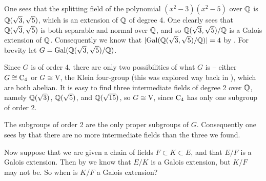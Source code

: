 \begin{example}
    One sees that the splitting field of the polynomial $(x^2 - 3)(x^2 - 5)$ over $\mathbb{Q}$ is $\mathbb{Q}(\sqrt3,\sqrt5)$, which is an extension of $\mathbb{Q}$ of degree 4. One clearly sees that $\mathbb{Q}(\sqrt3,\sqrt5)$ is both separable and normal over $\mathbb{Q}$, and so $\mathbb{Q}(\sqrt3,\sqrt5)/\mathbb{Q}$ is a Galois extension of $\mathbb{Q}$. Consequently we know that $|\mathrm{Gal}(\mathbb{Q}(\sqrt3,\sqrt5)/\mathbb{Q})| = 4$ by . For brevity let $G = \mathrm{Gal}(\mathbb{Q}(\sqrt3,\sqrt5)/\mathbb{Q})$.

    Since $G$ is of order 4, there are only two possibilities of what $G$ is -- either $G \cong \mathrm{C}_{4}$ or $G \cong \mathrm{V}$, the Klein four-group (this was explored way back in ), which are both abelian. It is easy to find three intermediate fields of degree 2 over $\mathbb{Q}$, namely $\mathbb{Q}(\sqrt3)$, $\mathbb{Q}(\sqrt5)$, and $\mathbb{Q}(\sqrt{15})$, so $G \cong \mathrm{V}$, since $\mathrm{C}_{4}$ has only one subgroup of order 2.

    The subgroups of order 2 are the only proper subgroups of $G$. Consequently one sees by  that there are no more intermediate fields than the three we found.
\end{example}

Now suppose that we are given a chain of fields $F \subset K \subset E$, and that $E/F$ is a Galois extension. Then by  we know that $E/K$ is a Galois extension, but $K/F$ may not be. So when is $K/F$ a Galois extension?

